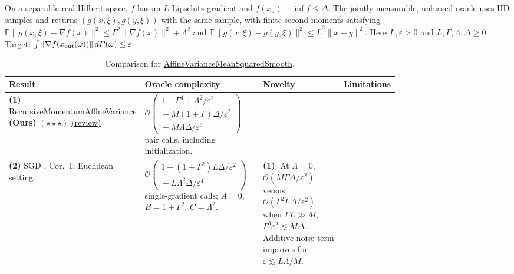 \begin{table}[tp]
\centering
\caption{Comparison for \href{https://github.com/k3nfalt/longtails/blob/main/LongTails/Setups/AffineVarianceMeanSquaredSmooth.lean}{AffineVarianceMeanSquaredSmooth}.}\label{tab:AffineVarianceMeanSquaredSmooth}
\parbox{\linewidth}{\footnotesize On a separable real Hilbert space, $f$ has an $L$-Lipschitz gradient and $f(x_0)-\inf f\le\Delta$. The jointly measurable, unbiased oracle uses IID samples and returns $(g(x,\xi),g(y,\xi))$ with the same sample, with finite second moments satisfying $\mathbb E\|g(x,\xi)-\nabla f(x)\|^2\le\Gamma^2\|\nabla f(x)\|^2+\Lambda^2$ and $\mathbb E\|g(x,\xi)-g(y,\xi)\|^2\le\bar L^2\|x-y\|^2$. Here $L,\varepsilon>0$ and $\bar L,\Gamma,\Lambda,\Delta\ge0$. Target: $\int\|\nabla f(x_{\rm out}(\omega))\|\,dP(\omega)\le\varepsilon$.}\par\smallskip
\begin{threeparttable}
\footnotesize
\setlength{\tabcolsep}{4pt}\renewcommand{\arraystretch}{1.25}
\begin{tabularx}{\linewidth}{@{}>{\raggedright\arraybackslash}p{0.20\linewidth}>{\raggedright\arraybackslash}p{0.32\linewidth}>{\raggedright\arraybackslash}p{0.25\linewidth}>{\raggedright\arraybackslash}X@{}}
\toprule
\textbf{Result} & \textbf{Oracle complexity} & \textbf{Novelty} & \textbf{Limitations} \\
\midrule
\textbf{(1)} \href{https://github.com/k3nfalt/longtails/blob/main/LongTails/Theorems/RecursiveMomentumAffineVariance.lean}{Recursive\allowbreak Momentum\allowbreak Affine\allowbreak Variance} \textbf{(Ours)} $(\star\star\star)$ \href{https://github.com/k3nfalt/longtails/blob/main/scripts/reviews/RecursiveMomentumAffineVariance.md}{(review)}
& $\mathcal{O}\!\left(\begin{gathered}1+\Gamma^4+\Lambda^2/\varepsilon^2\\ {}+M(1+\Gamma)\Delta/\varepsilon^2\\ {}+M\Lambda\Delta/\varepsilon^3\end{gathered}\right)$ pair calls, including initialization.
& & \\
\midrule[1.2pt]
\textbf{(2)} SGD \citep{avmsKhaledRichtarik2020v3}, Cor.~1; Euclidean setting.
& $\mathcal{O}\!\left(\begin{gathered}1+(1+\Gamma^2)L\Delta/\varepsilon^2\\ {}+L\Lambda^2\Delta/\varepsilon^4\end{gathered}\right)$ single-gradient calls; $A=0$, $B=1+\Gamma^2$, $C=\Lambda^2$.
& \textbf{(1)}: At $\Lambda=0$, $\mathcal{O}(M\Gamma\Delta/\varepsilon^2)$ versus $\mathcal{O}(\Gamma^2L\Delta/\varepsilon^2)$ when $\Gamma L\gg M$, $\Gamma^3\varepsilon^2\lesssim M\Delta$. Additive-noise term improves for $\varepsilon\lesssim L\Lambda/M$.

\end{tabularx}
\end{threeparttable}
\end{table}
